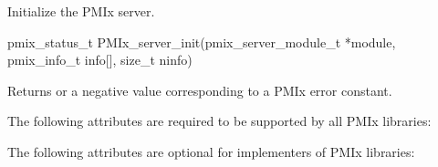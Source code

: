 \summary

Initialize the \ac{PMIx} server.

\format

\cspecificstart
\begin{codepar}
pmix_status_t
PMIx_server_init(pmix_server_module_t *module,
                 pmix_info_t info[], size_t ninfo)
\end{codepar}
\cspecificend

\begin{arglist}
\end{arglist}

Returns  or a negative value corresponding to a PMIx error constant.

\reqattrstart
The following attributes are required to be supported by all \ac{PMIx} libraries:


\reqattrend


\optattrstart
The following attributes are optional for implementers of \ac{PMIx} libraries:

